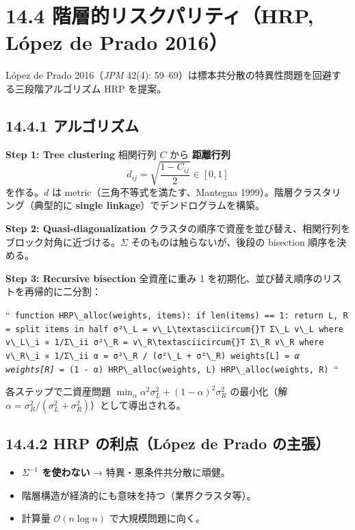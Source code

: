 \documentclass[11pt,a4paper]{report}
\begin{document}
\section{14.4 階層的リスクパリティ（HRP, López de Prado 2016）}

López de Prado 2016（\emph{JPM} 42(4): 59–69）は標本共分散の特異性問題を回避する三段階アルゴリズム HRP を提案。

\subsection{14.4.1 アルゴリズム}

\textbf{Step 1: Tree clustering} 相関行列 $C$ から \textbf{距離行列} \[ d_{ij} = \sqrt{\frac{1 - C_{ij}}{2}} \in [0, 1] \] を作る。$d$ は metric（三角不等式を満たす、Mantegna 1999）。階層クラスタリング（典型的に \textbf{single linkage}）でデンドログラムを構築。

\textbf{Step 2: Quasi-diagonalization} クラスタの順序で資産を並び替え、相関行列をブロック対角に近づける。$\Sigma$ そのものは触らないが、後段の bisection 順序を決める。

\textbf{Step 3: Recursive bisection} 全資産に重み 1 を初期化、並び替え順序のリストを再帰的に二分割：

``\texttt{ function HRP\textbackslash{}\_alloc(weights, items): if len(items) == 1: return L, R = split items in half σ²\textbackslash{}\_L = v\textbackslash{}\_L\textbackslash{}textasciicircum\{\}T Σ\textbackslash{}\_L v\textbackslash{}\_L  where v\textbackslash{}\_L\textbackslash{}\_i ∝ 1/Σ\textbackslash{}\_ii σ²\textbackslash{}\_R = v\textbackslash{}\_R\textbackslash{}textasciicircum\{\}T Σ\textbackslash{}\_R v\textbackslash{}\_R  where v\textbackslash{}\_R\textbackslash{}\_i ∝ 1/Σ\textbackslash{}\_ii α = σ²\textbackslash{}\_R / (σ²\textbackslash{}\_L + σ²\textbackslash{}\_R) weights[L] \emph{= α weights[R] }= (1 - α) HRP\textbackslash{}\_alloc(weights, L) HRP\textbackslash{}\_alloc(weights, R) }``

各ステップで二資産問題 $\min_\alpha \alpha^2 \sigma_L^2 + (1-\alpha)^2 \sigma_R^2$ の最小化（解 $\alpha = \sigma_R^2/(\sigma_L^2 + \sigma_R^2)$）として導出される。

\subsection{14.4.2 HRP の利点（López de Prado の主張）}

\begin{itemize}
\item \textbf{$\Sigma^{-1}$ を使わない} → 特異・悪条件共分散に頑健。
\item 階層構造が経済的にも意味を持つ（業界クラスタ等）。
\item 計算量 $\mathcal{O}(n \log n)$ で大規模問題に向く。
\end{itemize}
\end{document}
